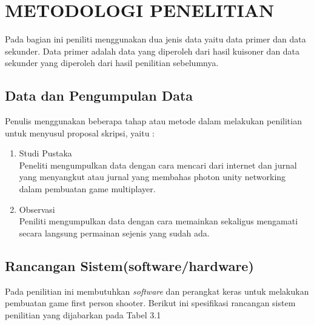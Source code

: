 \chapter{METODOLOGI PENELITIAN}
Pada bagian ini peniliti menggunakan dua jenis data yaitu data primer dan data sekunder. Data primer adalah data yang diperoleh dari hasil kuisoner dan data sekunder yang diperoleh dari hasil penilitian sebelumnya.

\section{Data dan Pengumpulan Data}
Penulis menggunakan beberapa tahap atau metode dalam melakukan penilitian untuk menyusul proposal skripsi, yaitu :

\begin{enumerate}
    \item Studi Pustaka \\ Peneliti mengumpulkan data dengan cara mencari dari internet dan jurnal yang menyangkut atau jurnal yang membahas photon unity networking dalam pembuatan game multiplayer.
    \item Observasi \\ Peniliti mengumpulkan data dengan cara memainkan sekaligus mengamati secara langsung permainan sejenis yang sudah ada.
\end{enumerate}

\section{Rancangan Sistem(software/hardware)}
    Pada penilitian ini membutuhkan \textit{software} dan perangkat keras untuk melakukan pembuatan game first person shooter. Berikut ini spesifikasi rancangan sistem penilitian yang dijabarkan pada Tabel 3.1
    
